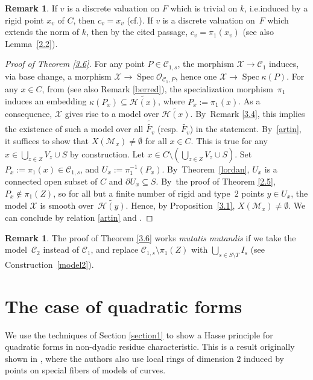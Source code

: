 \documentclass[10pt]{amsart}
\newcommand{\ie}{i.e.}
\newcommand{\cf}{cf.}
\newcommand{\loccit}{the cited passage}
\DeclareMathOperator{\Spec}{Spec}
\let\backslash\setminus
\theoremstyle{definition}
\newtheorem{rem}[thm]{Remark}
\begin{document}
\begin{rem} \label{3.7}
If $v$ is a discrete valuation on $F$ which is trivial on $k$, \ie induced by a rigid point $x_v$ of $C$, then $c_v=x_v$ (\cf \cite[Rem.\,8.3.19]{liulibri}).
If $v$ is a discrete valuation on~$F$ which extends the norm of $k$, then by \loccit, $c_v=\pi_1(x_v)$ (see also Lemma~\ref{2.2}).
\end{rem}

\begin{proof}[Proof of Theorem \ref{3.6}] For any point $P \in \mathscr{C}_{1,s}$,
the morphism $\mathcal{X} \to \mathscr{C}_1$ induces, via base change, a morphism $\mathcal{X} \to \Spec \mathcal{O}_{\mathscr{C}_1, P}$, hence one $\mathcal{X} \to \Spec \kappa(P)$. For any $x \in C$, from \cite[2.4, p.\,35]{Ber90} (see also Remark \ref{berred}), the specialization morphism~$\pi_1$ induces an embedding $\kappa(P_x) \subseteq \widetilde{\mathcal{H}(x)}$, where $P_x:=\pi_1(x)$. As a consequence, $\mathcal{X}$ gives rise to a model over $\widetilde{\mathcal{H}(x)}$. By~Remark \ref{3.4}, this implies the existence of such a model over all $\widetilde{\widetilde{F_v}}$ (resp. $\widetilde{F_v}$) in the statement. By~\eqref{artin}, it suffices to show that $X(\mathscr{M}_x) \neq \emptyset$ for all $x \in C$. This is true for any $x \in \bigcup_{z \in Z} V_z \cup S$ by construction. Let ${x \in C \backslash (\bigcup_{z \in Z} V_z \cup S)}$. Set $P_x:=\pi_1(x) \in \mathscr{C}_{1,s}$, and $U_x:=\pi_1^{-1}(P_x)$. By~Theorem~\ref{lordan}, $U_x$ is a connected open subset of $C$ and $\partial{U_x} \subseteq S$.
By~the proof of Theorem \ref{2.5}, $P_x \not \in \pi_1(Z)$, so for all but a finite number of rigid and type~$2$ points $y \in U_x$, the model $\mathcal{X}$ is smooth over~$\widetilde{\mathcal{H}(y)}$. Hence, by Proposition~\ref{3.1}, $X(\mathscr{M}_x) \neq \emptyset$. We can conclude by relation \eqref{artin} and \cite[Cor.\,3.18]{une}.
\end{proof}

\begin{rem}
The proof of Theorem \ref{3.6} works \emph{mutatis mutandis} if we take the model~$\mathscr{C}_2$ instead of $\mathscr{C}_1$, and replace $\mathscr{C}_{1,s} \backslash \pi_1(Z)$ with $\bigcup_{s \in S\backslash T} I_s$ (see Construction~\ref{model2}).
\end{rem}

\section{The case of quadratic forms} \label{quad}
We use the techniques of Section \ref{section1} to show a Hasse principle for quadratic forms in non-dyadic residue characteristic. This is a result originally shown in \cite[Th.\,3.1]{ctps}, where the authors also use local rings of dimension $2$ induced by points on special fibers of models of curves.
\end{document}
